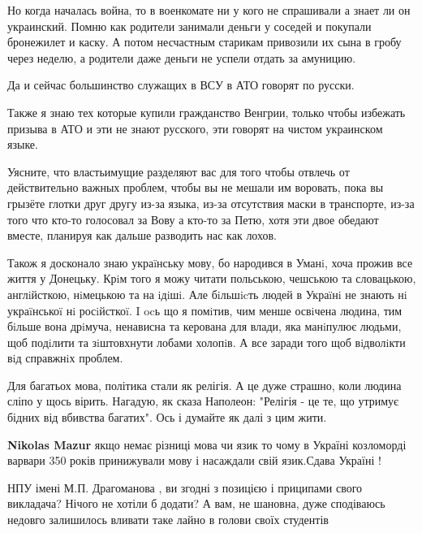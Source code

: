 \begin{itemize}
\begin{itemize}
Но когда началась война, то в военкомате ни у кого не спрашивали а знает ли он
украинский. Помню как родители занимали деньги у соседей и покупали бронежилет
и каску. А потом несчастным старикам привозили их сына в гробу через неделю, а
родители даже деньги не успели отдать за амуницию.

Да и сейчас большинство служащих в ВСУ в АТО говорят по русски.

Также я знаю тех которые купили гражданство Венгрии, только чтобы избежать
призыва в АТО и эти не знают русского, эти говорят на чистом украинском языке.

Уясните, что властьимущие разделяют вас для того чтобы отвлечь от действительно
важных проблем, чтобы вы не мешали им воровать, пока вы грызёте глотки друг
другу из-за языка, из-за отсутствия маски в транспорте, из-за того что кто-то
голосовал за Вову а кто-то за Петю, хотя эти двое обедают вместе, планируя как
дальше разводить нас как лохов.

Також я досконало знаю украïнську мову, бо народився в Уманi, хоча прожив все
життя у Донецьку. Крiм того я можу читати польською, чешською та словацькою,
англiйсткою, нiмецькою та на iдiшi. Але бiльшicть людей в Украïнi не знають нi
украïнськоï нi росiйсткоï. I ocь що я помiтив, чим менше освiчена людина, тим
бiльше вона дрiмуча, ненависна та керована для влади, яка манiпулює людьми, щоб
подiлити та зiштовхнути лобами холопiв. А все заради того щоб вiдволiкти вiд
справжнiх проблем.

Для багатьох мова, політика стали як релігія. А це дуже страшно, коли людина
сліпо у щось вірить. Нагадую, як сказа Наполеон: "Релігія - це те, що утримує
бідних від вбивства багатих". Ось і думайте як далі з цим жити.

\begin{itemize}

\textbf{Nikolas Mazur} якщо немає різниці мова чи язик то чому в Україні козломорді варвари 350 років принижували мову і насаждали свій язик.Сдава Україні !
\end{itemize}


НПУ імені М.П. Драгоманова , ви згодні з позицією і приципами свого викладача? Нічого не хотіли б додати?
А вам, не шановна, дуже сподіваюсь недовго залишилось вливати таке лайно в голови своїх студентів


\end{itemize}
\end{itemize}
